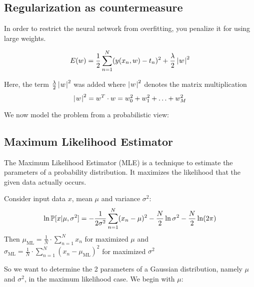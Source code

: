 
\subsection{Regularization as countermeasure}

In order to restrict the neural network from overfitting, you penalize it for using
large weights.

\[ E(w) = \frac12 \sum_{n=1}^N (y(x_n, w) - t_n)^2 + \frac{\lambda}{2} \left|\hspace{0.6999pt}w\hspace{0.6999pt}\right|^2 \]

Here, the term $\frac{\lambda}{2} \left|\hspace{0.6999pt}w\hspace{0.6999pt}\right|^2$ was added where $\left|\hspace{0.6999pt}w\hspace{0.6999pt}\right|^2$ denotes the
matrix multiplication
\[ \left|\hspace{0.6999pt}w\hspace{0.6999pt}\right|^2 = w^T \cdot w = w_0^2 + w_1^2 + \ldots + w_M^2 \]


We now model the problem from a probabilistic view:

\subsection{Maximum Likelihood Estimator}
%
%
%
The Maximum Likelihood Estimator (MLE) is a technique to estimate the parameters of a probability distribution.
It maximizes the likelihood that the given data actually occurs.


\begin{theorem}
  Consider input data $x$, mean $\mu$ and variance $\sigma^2$:
  \[ \ln{\mathbb P[x | \mu, \sigma^2]} = -\frac1{2\sigma^2} \sum_{n=1}^N (x_n - \mu)^2 - \frac{N}{2} \ln{\sigma^2} - \frac{N}{2} \ln(2\pi) \]
  Then
  $\mu_{\text{ML}} = \frac{1}{N} \cdot \sum_{n=1}^N x_n$ for maximized $\mu$ and \\
    $\sigma_{\text{ML}} = \frac{1}{N}\cdot \sum_{n=1}^N (x_n - \mu_{\text{ML}})^2$ for maximized $\sigma^2$
\end{theorem}

So we want to determine the 2 parameters of a Gaussian distribution, namely $\mu$ and $\sigma^2$, in the maximum likelihood case.
We begin with $\mu$:


